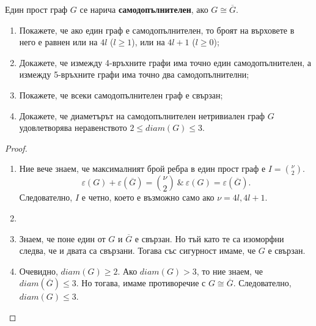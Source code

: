 Един прост граф $G$ се нарича {\bf самодопълнителен}, ако  $G\cong\overline{G}$.

\begin{problem} %
  \begin{enumerate}
  \item
    Покажете, че ако един граф е самодопълнителен, то броят на върховете в него е равнен или на $4l$ ($l\geq 1$), или на $4l+1$ ($l\geq 0$);
  \item
    Докажете, че измежду 4-връхните графи има точно един самодопълнителен, а измежду 5-връхните графи има точно два самодопълнителни;
  \item
    Покажете, че всеки самодопълнителен граф е свързан;
  \item
    Докажете, че диаметърът на самодопълнителен нетривиален граф $G$ удовлетворява неравенството $2\leq diam(G) \leq 3$.
\end{enumerate}
\end{problem}
\begin{proof}
  \begin{enumerate}
  \item
    Ние вече знаем, че максималният брой ребра в един прост граф е $I = \binom{\nu}{2}$.
    \[\varepsilon(G) + \varepsilon(\overline{G}) = \binom{\nu}{2}\ \&\ \varepsilon(G) = \varepsilon(\overline{G}).\]
    Следователно, $I$ е четно, което е възможно само ако $\nu = 4l,4l+1$.
  \item
  \item
    Знаем, че поне един от $G$ и $\overline{G}$ е свързан.
    Но тъй като те са изоморфни следва, че и двата са свързани.
    Тогава със сигурност имаме, че $G$ е свързан.
  \item
    Очевидно, $diam(G)\geq 2$. Ако $diam(G) > 3$, то ние знаем, че $diam(\overline{G})\leq 3$.
    Но тогава, имаме противоречие с $G\cong\overline{G}$.
    Следователно, $diam(G)\leq 3$.
  \end{enumerate}
\end{proof}


